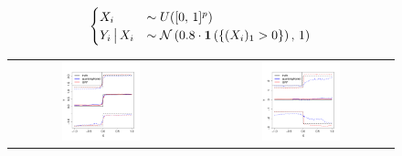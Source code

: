 \documentclass[aos]{imsart}
\theoremstyle{plain}
\theoremstyle{definition}
\theoremstyle{remark}
\newcommand{\FIGW}{0.45}
\begin{document}
\begin{CJK}{UTF8}{gbsn}
\newpage

\begin{equation*}
\begin{cases}
X_i &\sim U([0, \, 1]^p) \\
Y_i \cond X_i &\sim \nn\p{0.8 \cdot \mathbf{1}\p{\cb{(X_i)_1 > 0}}, \, 1}
\end{cases}
\end{equation*}

\begin{figure}
\centering
\begin{tabular}{ccc}
\includegraphics[width=\FIGW\textwidth]{quantile_plot_shift_n2k_p40.pdf} & &
\includegraphics[width=\FIGW\textwidth]{quantile_plot_spread_n2k_p40.pdf} \\

\end{tabular}
\end{figure}
\end{CJK}
\end{document}

